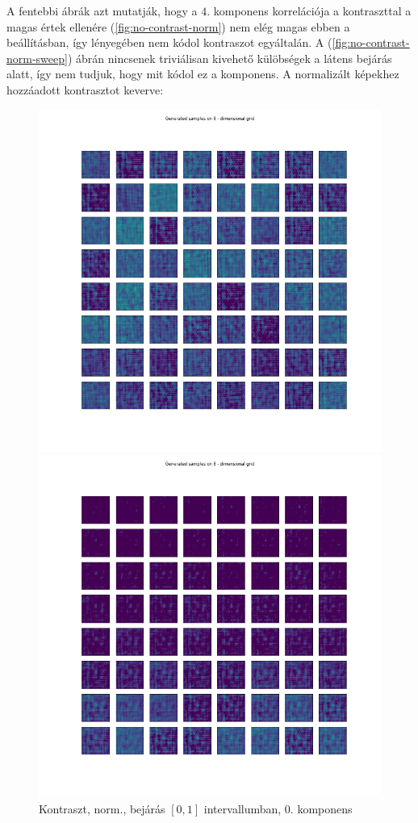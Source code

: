 \documentclass[12pt, english]{article}
\begin{document}
 \par A fentebbi ábrák azt mutatják, hogy a $4.$ komponens korrelációja a kontraszttal a magas értek ellenére (\ref{fig:no-contrast-norm}) nem elég magas ebben a beállításban, így lényegében nem kódol kontraszot egyáltalán. A (\ref{fig:no-contrast-norm-sweep}) ábrán nincsenek triviálisan kivehető külöbségek a látens bejárás alatt, így nem tudjuk, hogy mit kódol ez a komponens. A normalizált képekhez hozzáadott kontrasztot keverve:

\vspace{4mm}
 
\begin{figure}[H]
  \begin{minipage}{0.5\linewidth}
    \centering
    \includegraphics[width=.85\linewidth]{sweep/norm_contrast_sweep_zero_to_one_0th_param.png} 
    \caption{Kontraszt, norm., bejárás $[0, 1]$ \newline intervallumban, $0.$ komponens} 
    \label{fig:contrast-norm-sweep-0}
  \end{minipage} 
  \begin{minipage}{0.5\linewidth}
    \centering
    \includegraphics[width=.85\linewidth]{sweep/norm_contrast_sweep_minus_two_to_one_2nd_param.png} 

\end{minipage}
\end{figure}
\end{document}
